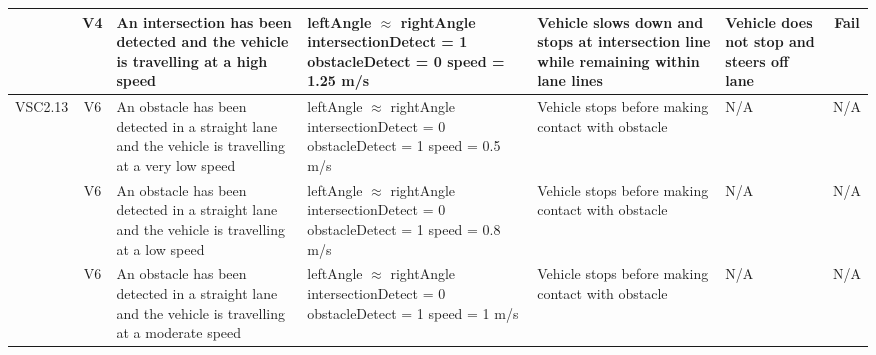 \documentclass [10pt]{article}
\begin{document}
\begin{longtable}{ | p{ } | p{ } |  p{ } |  p{ } | p{ } | p{ } |  p{ } |}
    \rowcolor{tableCell}\multicolumn{1}{|c|}{VSC2.12} 
    & \multicolumn{1}{c|}{V4}
    & An intersection has been detected and the vehicle is travelling at a high speed
    & leftAngle $\approx$ rightAngle \newline
    intersectionDetect = 1 \newline
    obstacleDetect = 0 \newline
    speed = 1.25 m/s
    & Vehicle slows down and stops at intersection line while remaining within lane lines
    & Vehicle does not stop and steers off lane
    & \multicolumn{1}{c|}{Fail}\\\hline
    
    \multicolumn{1}{|c|}{VSC2.13} 
    & \multicolumn{1}{c|}{V6}
    & An obstacle has been detected in a straight lane and the vehicle is travelling at a very low speed
    & leftAngle $\approx$ rightAngle \newline
    intersectionDetect = 0 \newline
    obstacleDetect = 1 \newline
    speed = 0.5 m/s
    & Vehicle stops before making contact with obstacle
    & N/A
    & \multicolumn{1}{c|}{N/A}\\ \hline
    
    \rowcolor{tableCell}\multicolumn{1}{|c|}{VSC2.14} 
    & \multicolumn{1}{c|}{V6}
    & An obstacle has been detected in a straight lane and the vehicle is travelling at a low speed
    & leftAngle $\approx$ rightAngle \newline
    intersectionDetect = 0 \newline
    obstacleDetect = 1 \newline
    speed = 0.8 m/s
    & Vehicle stops before making contact with obstacle
    & N/A
    & \multicolumn{1}{c|}{N/A}\\  \hline
    
    \newpage \hline
    
    \multicolumn{1}{|c|}{VSC2.15} 
    & \multicolumn{1}{c|}{V6}
    & An obstacle has been detected in a straight lane and the vehicle is travelling at a moderate speed
    & leftAngle $\approx$ rightAngle \newline
    intersectionDetect = 0 \newline
    obstacleDetect = 1 \newline
    speed = 1 m/s
    & Vehicle stops before making contact with obstacle
    & N/A
    & \multicolumn{1}{c|}{N/A}\\\hline
    

\end{longtable}
\end{document}
